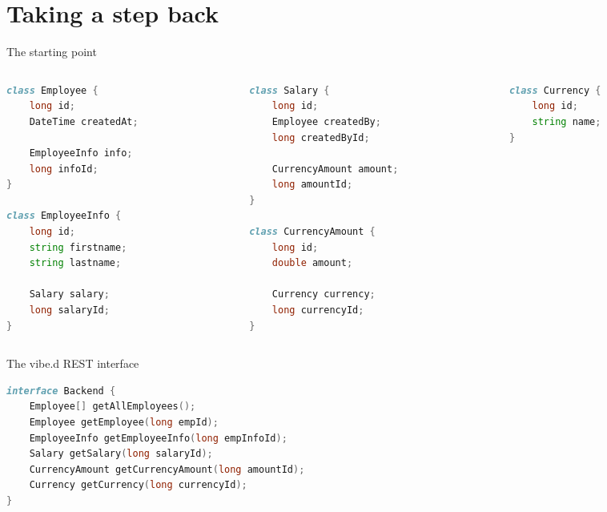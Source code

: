 \documentclass[aspectratio=169,notes]{beamer}
\begin{document}
	\section{Taking a step back}
	\begin{frame}[fragile]{The starting point}
\begin{columns}
\begin{column}{0.35\textwidth}
\begin{lstlisting}[language=D,basicstyle=\scriptsize\ttfamily]
class Employee {
	long id;
	DateTime createdAt;

	EmployeeInfo info;
	long infoId;
}	

class EmployeeInfo {
	long id;
	string firstname;
	string lastname;

	Salary salary;
	long salaryId;
}	
\end{lstlisting}
\end{column}
\begin{column}{0.35\textwidth}
\begin{lstlisting}[language=D,basicstyle=\scriptsize\ttfamily,firstnumber=17]
class Salary {
	long id;
	Employee createdBy;
	long createdById;

	CurrencyAmount amount;
	long amountId;
}

class CurrencyAmount {
	long id;
	double amount;

	Currency currency;
	long currencyId;
}
\end{lstlisting}
\end{column}
\begin{column}{0.25\textwidth}
\begin{lstlisting}[language=D,basicstyle=\scriptsize\ttfamily,firstnumber=32]
class Currency {
	long id;
	string name;
}
\end{lstlisting}
\end{column}
\end{columns}
	\end{frame}

	\begin{frame}[fragile]{The vibe.d REST interface}
\begin{lstlisting}[language=D,basicstyle=\normalsize\ttfamily]
interface Backend {
	Employee[] getAllEmployees();
	Employee getEmployee(long empId);
	EmployeeInfo getEmployeeInfo(long empInfoId);
	Salary getSalary(long salaryId);
	CurrencyAmount getCurrencyAmount(long amountId);
	Currency getCurrency(long currencyId);
}
\end{lstlisting}
	\end{frame}
\end{document}
